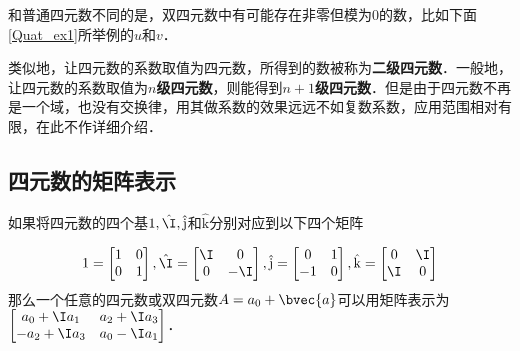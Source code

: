 和普通四元数不同的是，双四元数中有可能存在非零但模为0的数，比如下面\autoref{Quat_ex1}所举例的$u$和$v$．

类似地，让四元数的系数取值为四元数，所得到的数被称为\textbf{二级四元数}．一般地，让四元数的系数取值为$n$\textbf{级四元数}，则能得到$n+1$\textbf{级四元数}．但是由于四元数不再是一个域，也没有交换律，用其做系数的效果远远不如复数系数，应用范围相对有限，在此不作详细介绍．


\subsection{四元数的矩阵表示}

如果将四元数的四个基$1, \hat{\I}, \hat{\mathrm{j}}$和$\hat{\mathrm{k}}$分别对应到以下四个矩阵

\begin{equation}

1=\left[\begin{matrix}1&0\\0&1\end{matrix} \right], \hat{\I}=\left[\begin{matrix}\I&0\\0&-\I\end{matrix} \right], \hat{\mathrm{j}}=\left[\begin{matrix}0&1\\-1&0\end{matrix} \right], \hat{\mathrm{k}}=\left[\begin{matrix}0&\I\\\I&0\end{matrix} \right]

\end{equation}
那么一个任意的四元数或双四元数$A=a_0+\bvec{a}$可以用矩阵表示为$\left[\begin{matrix}a_0+\I a_1&a_2+\I a_3\\-a_2+\I a_3&a_0-\I a_1 \end{matrix} \right]$．


